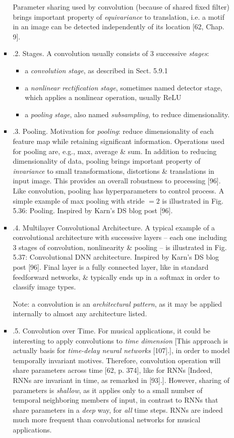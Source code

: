 \documentclass{article}
\begin{document}
\begin{itemize}
\begin{itemize}
\begin{itemize}
			Parameter sharing used by convolution (because of shared fixed filter) brings important property of {\it equivariance} to translation, i.e. a motif in an image can be detected independently of its location [62, Chap. 9].
			\item {.2. Stages.} A convolution usually consists of 3 successive {\it stages}:
			\begin{itemize}
				\item a {\it convolution stage}, as described in Sect. 5.9.1
				\item a {\it nonlinear rectification stage}, sometimes named detector stage, which applies a nonlinear operation, usually ReLU
				\item a {\it pooling stage}, also named {\it subsampling}, to reduce dimensionality.
			\end{itemize}
			\item {.3. Pooling.} Motivation for {\it pooling}: reduce dimensionality of each feature map while retaining significant information. Operations used for pooling are, e.g., max, average \& sum. In addition to reducing dimensionality of data, pooling brings important property of {\it invariance} to small transformations, distortions \& translations in input image. This provides an overall robustness to processing [96]. Like convolution, pooling has hyperparameters to control process. A simple example of max pooling with stride $= 2$ is illustrated in {\sf Fig. 5.36: Pooling. Inspired by {\sc Karn}'s DS blog post [96]}.
			\item {.4. Multilayer Convolutional Architecture.} A typical example of a convolutional architecture with successive layers -- each one including 3 stages of convolution, nonlinearity \& pooling -- is illustrated in {\sf Fig. 5.37: Convolutional DNN architecture. Inspired by {\sc Karn}'s DS blog post [96]}. Final layer is a fully connected layer, like in standard feedforward networks, \& typically ends up in a softmax in order to classify image types.
			
			Note: a convolution is an {\it architectural pattern}, as it may be applied internally to almost any architecture listed.
			\item {.5. Convolution over Time.} For musical applications, it could be interesting to apply convolutions to {\it time dimension} [This approach is actually basis for {\it time-delay neural networks} [107].], in order to model temporally invariant motives. Therefore, convolution operation will share parameters across time [62, p. 374], like for RNNs [Indeed, RNNs are invariant in time, as remarked in [93].]. However, sharing of parameters is {\it shallow}, as it applies only to a small number of temporal neighboring members of input, in contrast to RNNs that share parameters in a {\it deep} way, for {\it all} time steps. RNNs are indeed much more frequent than convolutional networks for musical applications.
			

\end{itemize}
\end{itemize}
\end{itemize}
\end{document}
